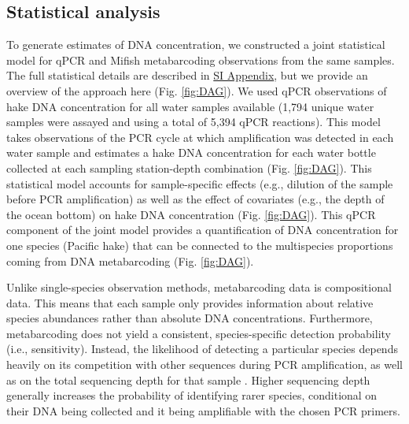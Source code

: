 \documentclass[9pt,twocolumn,twoside]{pnas-new}
\begin{document}
{\subsection*{Statistical analysis}
To generate estimates of DNA concentration, we constructed a joint statistical model for qPCR and Mifish metabarcoding observations from the same samples. The full statistical details are described in \href{SI_Appendix.pdf}{SI Appendix}, but we provide an overview of the approach here (Fig. \ref{fig:DAG}). We used qPCR observations of hake DNA concentration for all water samples available (1,794 unique water samples were assayed and using a total of 5,394 qPCR reactions). This model takes observations of the PCR cycle at which amplification was detected in each water sample and estimates a hake DNA concentration for each water bottle collected at each sampling station-depth combination (Fig. \ref{fig:DAG}). This statistical model accounts for sample-specific effects (e.g., dilution of the sample before PCR amplification) as well as the effect of covariates (e.g., the depth of the ocean bottom) on hake DNA concentration (Fig. \ref{fig:DAG}). This qPCR component of the joint model provides a quantification of DNA concentration for one species (Pacific hake) that can be connected to the multispecies proportions coming from DNA metabarcoding (Fig. \ref{fig:DAG}).

Unlike single-species observation methods, metabarcoding data is compositional data. This means that each sample only provides information about relative species abundances rather than absolute DNA concentrations. Furthermore, metabarcoding does not yield a consistent, species-specific detection probability (i.e., sensitivity). Instead, the likelihood of detecting a particular species depends heavily on its competition with other sequences during PCR amplification, as well as on the total sequencing depth for that sample \cite{kelly2019}. Higher sequencing depth generally increases the probability of identifying rarer species, conditional on their DNA being collected and it being amplifiable with the chosen PCR primers.

}
\end{document}
